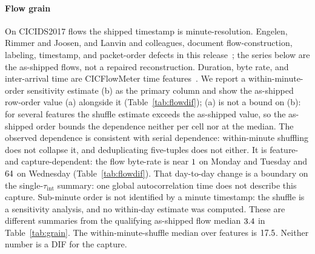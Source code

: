 \documentclass[a4paper,fleqn]{cas-dc}
\newcommand{\DIF}{\mathrm{DIF}}
\newcommand{\tabwidth}{\columnwidth}
\newcommand{\tabbody}{\small\setlength{\tabcolsep}{3.5pt}\renewcommand{\arraystretch}{1.08}}
\newcommand{\onetab}{\renewcommand{\tabwidth}{\columnwidth}\tabbody}
\begin{document}
\paragraph{Flow grain} On CICIDS2017 flows the shipped timestamp is minute-resolution.
Engelen, Rimmer and Joosen, and Lanvin and colleagues, document flow-construction, labeling,
timestamp, and packet-order defects in this
release~\citep{engelen2021troubleshooting,lanvin2023cicids}; the series below are the as-shipped flows, not a
repaired reconstruction. Duration, byte rate, and inter-arrival time are CICFlowMeter time
features~\citep{lashkari2017tor}. We report
a within-minute-order sensitivity estimate (b) as the primary column and show the as-shipped row-order value (a)
alongside it (Table~\ref{tab:flowdif}); (a) is not a bound on (b): for several features the shuffle
estimate exceeds the as-shipped value, so the as-shipped order bounds the dependence neither per cell
nor at the median. The observed dependence is consistent with serial dependence: within-minute
shuffling does not collapse it, and deduplicating five-tuples does not either. It is feature- and
capture-dependent: the flow byte-rate is
near $1$ on Monday and Tuesday and $64$ on Wednesday
(Table~\ref{tab:flowdif}). That day-to-day
change is a boundary on the single-$\tau_{\mathrm{int}}$ summary: one global autocorrelation time
does not describe this capture. Sub-minute order is not identified by a minute timestamp: the
shuffle is a sensitivity analysis, and no within-day estimate was computed. These are different
summaries from the qualifying as-shipped flow median $3.4$ in Table~\ref{tab:grain}.
The within-minute-shuffle median over features is $17.5$. Neither number is a DIF for the capture.
\begin{table}[ht]
\centering
\caption{CICIDS2017 benign flow-grain $\DIF$, three days. Each entry is the within-minute-shuffle
estimate, with the as-shipped value in parentheses; that value is not a bound. From
\texttt{results/cicids\_flow\_dif.csv}.}\label{tab:flowdif}
\onetab

\end{table}
\end{document}
